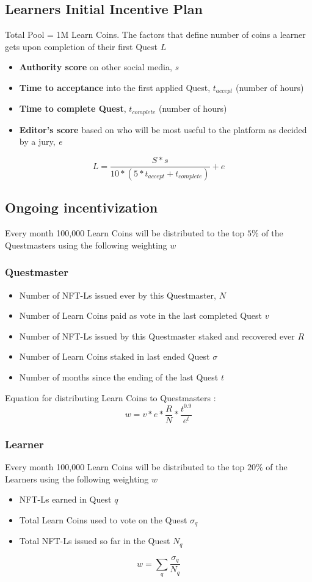\documentclass{article}
\begin{document}
    \subsection{Learners Initial Incentive Plan}
      Total Pool = 1M Learn Coins. The factors that define number of coins a learner gets upon completion of their first Quest \(L\)
      \begin{itemize}
        \item \textbf{Authority score} on other social media, \textit{s}
        \item \textbf{Time to acceptance} into the first applied Quest, \(t_{accept}\) (number of hours)
        \item \textbf{Time to complete Quest}, \(t_{complete}\) (number of hours)
        \item \textbf{Editor's score} based on who will be most useful to the platform as decided by a jury, \textit{e}
      \end{itemize}
      \[
        L = \frac{S * s}{10 * (5*t_{accept} + t_{complete})} + e
      \]
    \subsection{Ongoing incentivization}
      Every month 100,000 Learn Coins will be distributed to the top \(5\%\) of the Questmasters using the following weighting \(w\) 
      \subsubsection{Questmaster}
        \begin{itemize}
          \item Number of NFT-Ls issued ever by this Questmaster, \(N\)
          \item Number of Learn Coins paid as vote in the last completed Quest \(v\)
          \item Number of NFT-Ls issued by this Questmaster staked and recovered ever \(R\)
          \item Number of Learn Coins staked in last ended Quest \(\sigma\)
          \item Number of months since the ending of the last Quest \(t\)
        \end{itemize}
        Equation for distributing Learn Coins to Questmasters :
        \[
          w =  v * e * \frac{R}{N} * \frac{t^{0.9}}{e^{t}}
        \]

      \subsubsection{Learner }  
        Every month 100,000 Learn Coins will be distributed to the top \(20\%\) of the Learners using the following weighting \(w\) 
        \begin{itemize}
          \item NFT-Ls earned in Quest \(q\)
          \item Total Learn Coins used to vote on the Quest \(\sigma_q\)
          \item Total NFT-Ls issued so far in the Quest \(N_q\)
        \end{itemize}
        \[
          w = \sum_{q} \frac{\sigma_q}{N_q}
        \]
\end{document}
